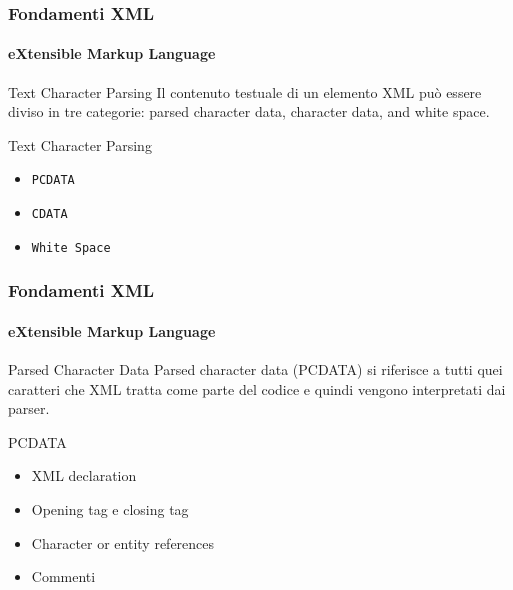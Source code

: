 \begin{frame}
    \frametitle{Fondamenti XML}
    \framesubtitle{eXtensible Markup Language}
    \addtocounter{nframe}{1}

	\begin{block}{Text Character Parsing}
		Il contenuto testuale di un elemento XML può essere diviso in tre categorie:
		parsed character data, character data, and white space.
	\end{block}

	\begin{block}{Text Character Parsing}
		\begin{itemize}
			\item \texttt{PCDATA}
			\item \texttt{CDATA}
			\item \texttt{White Space}
		\end{itemize}
	\end{block}

\end{frame}


\begin{frame}
    \frametitle{Fondamenti XML}
    \framesubtitle{eXtensible Markup Language}
    \addtocounter{nframe}{1}

	\begin{block}{Parsed Character Data}
		Parsed character data (PCDATA) si riferisce a tutti quei caratteri che XML tratta come parte del codice e quindi vengono interpretati dai parser.
	\end{block}

	\begin{block}{PCDATA}
		\begin{itemize}
			\item XML declaration
			\item Opening tag e  closing tag
			\item Character or entity references
			\item Commenti
		\end{itemize}
	\end{block}

\end{frame}


